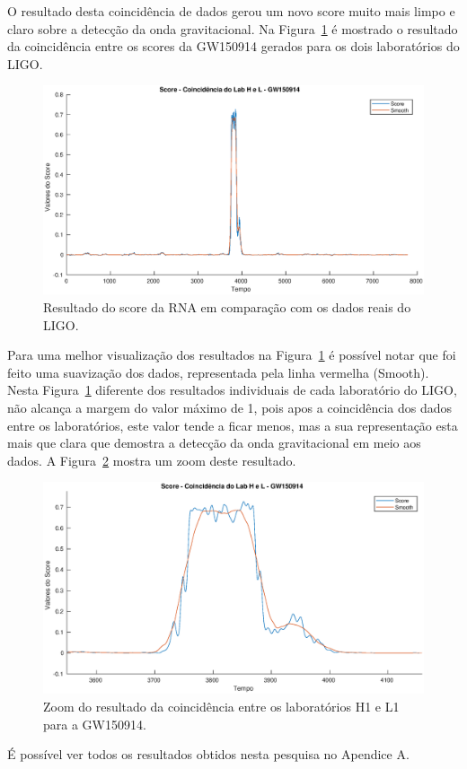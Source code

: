 O resultado desta coincidência de dados gerou um novo score muito mais limpo e claro sobre a detecção da onda gravitacional. Na Figura~\ref{fig:scoreHL} é mostrado o resultado da coincidência entre os scores da GW150914 gerados para os dois laboratórios do LIGO.

\begin{figure}[H]
\centering
\includegraphics[width=1\textwidth]{figuras/GW150914_LabHL.eps}
\caption{Resultado do score da RNA em comparação com os dados reais do LIGO.}
\label{fig:scoreHL}
\end{figure}

Para uma melhor visualização dos resultados na Figura~\ref{fig:scoreHL} é possível notar que foi feito uma suavização dos dados, representada pela linha vermelha (Smooth). Nesta Figura~\ref{fig:scoreHL} diferente dos resultados individuais de cada laboratório do LIGO, não alcança a margem do valor máximo de 1, pois apos a coincidência dos dados entre os laboratórios, este valor tende a ficar menos, mas a sua representação esta mais que clara que demostra a detecção da onda gravitacional em meio aos dados. A Figura~\ref{fig:scoreHLZoom} mostra um zoom deste resultado.

\begin{figure}[H]
\centering
\includegraphics[width=1\textwidth]{figuras/GW150914_LabHL_zoom.eps}
\caption{Zoom do resultado da coincidência entre os laboratórios H1 e L1 para a GW150914.}
\label{fig:scoreHLZoom}
\end{figure}

É possível ver todos os resultados obtidos nesta pesquisa no Apendice A.